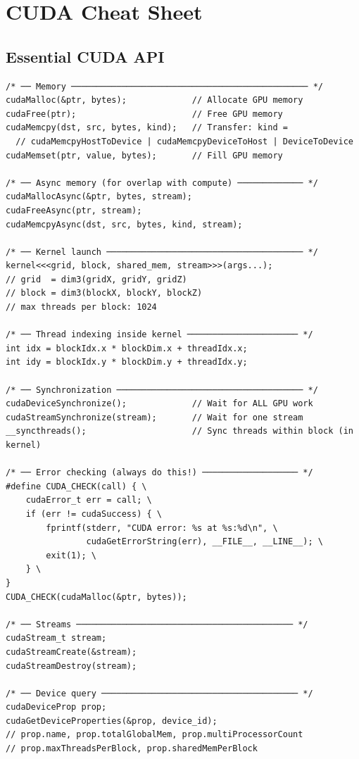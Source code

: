 \documentclass[11pt, twoside, openright]{book}
\begin{document}
\appendix

\chapter{CUDA Cheat Sheet}
\label{app:cuda}

\section*{Essential CUDA API}

\begin{lstlisting}[style=cstyle, caption={CUDA Cheat Sheet}]
/* ── Memory ─────────────────────────────────────────────── */
cudaMalloc(&ptr, bytes);             // Allocate GPU memory
cudaFree(ptr);                       // Free GPU memory
cudaMemcpy(dst, src, bytes, kind);   // Transfer: kind =
  // cudaMemcpyHostToDevice | cudaMemcpyDeviceToHost | DeviceToDevice
cudaMemset(ptr, value, bytes);       // Fill GPU memory

/* ── Async memory (for overlap with compute) ───────────── */
cudaMallocAsync(&ptr, bytes, stream);
cudaFreeAsync(ptr, stream);
cudaMemcpyAsync(dst, src, bytes, kind, stream);

/* ── Kernel launch ─────────────────────────────────────── */
kernel<<<grid, block, shared_mem, stream>>>(args...);
// grid  = dim3(gridX, gridY, gridZ)
// block = dim3(blockX, blockY, blockZ)
// max threads per block: 1024

/* ── Thread indexing inside kernel ────────────────────── */
int idx = blockIdx.x * blockDim.x + threadIdx.x;
int idy = blockIdx.y * blockDim.y + threadIdx.y;

/* ── Synchronization ───────────────────────────────────── */
cudaDeviceSynchronize();             // Wait for ALL GPU work
cudaStreamSynchronize(stream);       // Wait for one stream
__syncthreads();                     // Sync threads within block (in kernel)

/* ── Error checking (always do this!) ─────────────────── */
#define CUDA_CHECK(call) { \
    cudaError_t err = call; \
    if (err != cudaSuccess) { \
        fprintf(stderr, "CUDA error: %s at %s:%d\n", \
                cudaGetErrorString(err), __FILE__, __LINE__); \
        exit(1); \
    } \
}
CUDA_CHECK(cudaMalloc(&ptr, bytes));

/* ── Streams ─────────────────────────────────────────── */
cudaStream_t stream;
cudaStreamCreate(&stream);
cudaStreamDestroy(stream);

/* ── Device query ─────────────────────────────────────── */
cudaDeviceProp prop;
cudaGetDeviceProperties(&prop, device_id);
// prop.name, prop.totalGlobalMem, prop.multiProcessorCount
// prop.maxThreadsPerBlock, prop.sharedMemPerBlock
\end{lstlisting}
\end{document}
